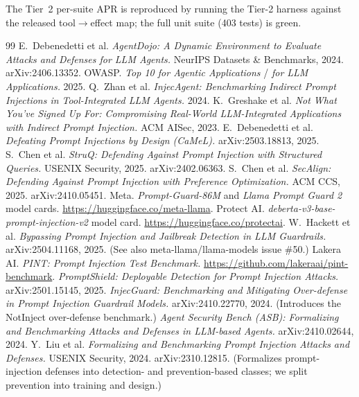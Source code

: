 \documentclass[11pt]{article}
\begin{document}
The Tier~2 per-suite APR is reproduced by running the Tier-2 harness against the released
tool$\to$effect map; the full unit suite (403 tests) is green.

\begin{thebibliography}{99}
\sloppy
{} E.~Debenedetti et al. \emph{AgentDojo: A Dynamic Environment to Evaluate
  Attacks and Defenses for LLM Agents.} NeurIPS Datasets \& Benchmarks, 2024. arXiv:2406.13352.
 OWASP. \emph{Top 10 for Agentic Applications} / \emph{for LLM Applications.} 2025.
 Q.~Zhan et al. \emph{InjecAgent: Benchmarking Indirect Prompt Injections in
  Tool-Integrated LLM Agents.} 2024.
 K.~Greshake et al. \emph{Not What You've Signed Up For: Compromising Real-World
  LLM-Integrated Applications with Indirect Prompt Injection.} ACM AISec, 2023.
 E.~Debenedetti et al. \emph{Defeating Prompt Injections by Design (CaMeL).}
  arXiv:2503.18813, 2025.
 S.~Chen et al. \emph{StruQ: Defending Against Prompt Injection with Structured
  Queries.} USENIX Security, 2025. arXiv:2402.06363.
 S.~Chen et al. \emph{SecAlign: Defending Against Prompt Injection with Preference
  Optimization.} ACM CCS, 2025. arXiv:2410.05451.
 Meta. \emph{Prompt-Guard-86M} and \emph{Llama Prompt Guard 2} model cards.
  \url{https://huggingface.co/meta-llama}.
 Protect AI. \emph{deberta-v3-base-prompt-injection-v2} model card.
  \url{https://huggingface.co/protectai}.
 W.~Hackett et al. \emph{Bypassing Prompt Injection and Jailbreak Detection in
  LLM Guardrails.} arXiv:2504.11168, 2025. (See also meta-llama/llama-models issue \#50.)
 Lakera AI. \emph{PINT: Prompt Injection Test Benchmark.}
  \url{https://github.com/lakeraai/pint-benchmark}.
 \emph{PromptShield: Deployable Detection for Prompt Injection Attacks.}
  arXiv:2501.15145, 2025.
 \emph{InjecGuard: Benchmarking and Mitigating Over-defense in Prompt Injection
  Guardrail Models.} arXiv:2410.22770, 2024. (Introduces the NotInject over-defense benchmark.)
 \emph{Agent Security Bench (ASB): Formalizing and Benchmarking Attacks and Defenses in
  LLM-based Agents.} arXiv:2410.02644, 2024.
 Y.~Liu et al. \emph{Formalizing and Benchmarking Prompt Injection Attacks and
  Defenses.} USENIX Security, 2024. arXiv:2310.12815. (Formalizes prompt-injection defenses into
  detection- and prevention-based classes; we split prevention into training and design.)

\end{thebibliography}
\end{document}
